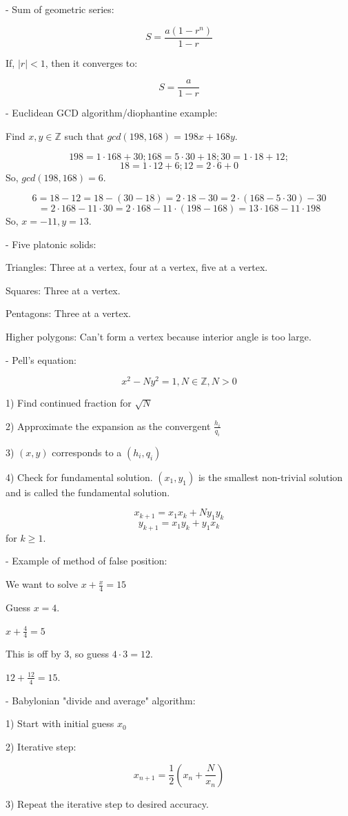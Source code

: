 \documentclass{article}
\newcommand{\ZZ}{\mathbb{Z}}
\begin{document}
- Sum of geometric series:

\[S = \frac{a(1 - r^n)}{1-r}\]

If, $|r| < 1$, then it converges to:

\[S = \frac{a}{1-r}\]

- Euclidean GCD algorithm/diophantine example:

Find $x, y \in \ZZ$ such that $gcd(198, 168) = 198x + 168y$.

\[198 = 1 \cdot 168 + 30; 168 = 5 \cdot 30 + 18; 30 = 1 \cdot 18 + 12;\]
\[18 = 1 \cdot 12 + 6; 12 = 2 \cdot 6 + 0\]
So, $gcd(198, 168) = 6$.

\[6 = 18 - 12 = 18 - (30 - 18) = 2 \cdot 18 - 30 = 2 \cdot (168 - 5 \cdot 30) - 30\]
\[= 2 \cdot 168 - 11 \cdot 30 = 2 \cdot 168 - 11 \cdot (198 - 168) = 13 \cdot 168 - 11 \cdot 198\]
So, $x = -11, y = 13$.

- Five platonic solids:

Triangles: Three at a vertex, four at a vertex, five at a vertex.

Squares: Three at a vertex.

Pentagons: Three at a vertex.

Higher polygons: Can't form a vertex because interior angle is too large.

- Pell's equation:

\[x^2 - Ny^2 = 1, N \in \ZZ, N > 0\]

1) Find continued fraction for $\sqrt{N}$

2) Approximate the expansion as the convergent $\frac{h_i}{q_i}$

3) $(x, y)$ corresponds to a $(h_i, q_i)$

4) Check for fundamental solution. $(x_1, y_1)$ is the smallest non-trivial solution
and is called the fundamental solution.

\[x_{k+1} = x_1 x_k + N y_1 y_k\]
\[y_{k+1} = x_1 y_k + y_1 x_k\]
for $k \geq 1$.

- Example of method of false position:

We want to solve $x + \frac{x}{4} = 15$

Guess $x = 4$.

$x + \frac{4}{4} = 5$

This is off by 3, so guess $4 \cdot 3 = 12$.

$12 + \frac{12}{4} = 15$.

- Babylonian "divide and average" algorithm:

1) Start with initial guess $x_0$

2) Iterative step:

\[x_{n+1} = \frac{1}{2}\left(x_n + \frac{N}{x_n}\right)\]

3) Repeat the iterative step to desired accuracy.
\end{document}
